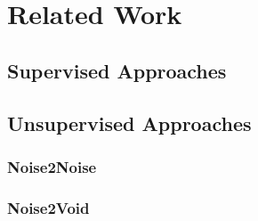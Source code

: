 \chapter{Related Work}\label{ch:related-work}


\section{Supervised Approaches}

\section{Unsupervised Approaches}

\subsection{Noise2Noise}

\subsection{Noise2Void}
